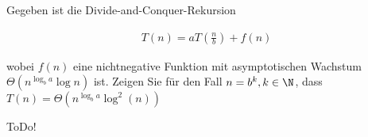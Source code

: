 
\begin{exercise}

Gegeben ist die Divide-and-Conquer-Rekursion

\begin{align*}
  T(n) = aT(\frac{n}{b}) + f(n)
\end{align*}

wobei $f(n)$ eine nichtnegative Funktion mit asymptotischen Wachstum $\Theta(n^{\log_ba}\log n)$ ist. Zeigen Sie für den Fall $n = b^k, k \in \N$, dass $T(n) = \Theta(n^{\log_ba}\log^2 (n))$

\end{exercise}


\begin{solution}

ToDo!

\end{solution}

